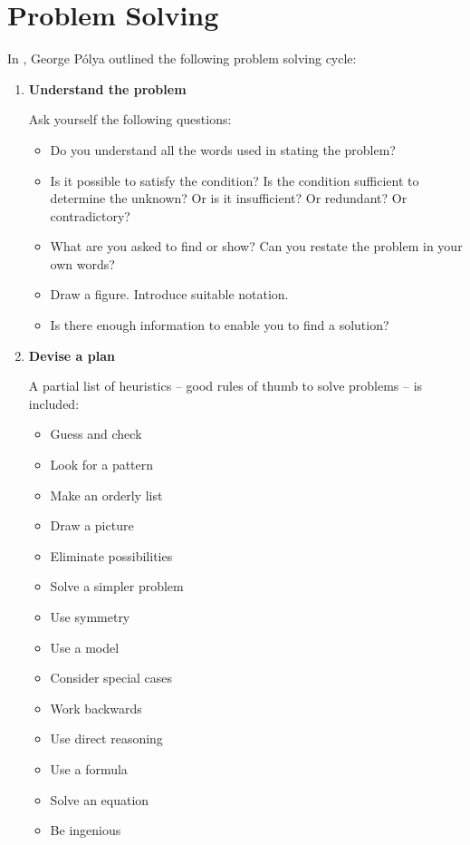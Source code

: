 \documentclass[12pt,a4 paper]{extreport}
\begin{document}
\section*{Problem Solving}
In \cite{polya}, George P\'{o}lya outlined the following problem solving cycle:
\begin{enumerate}
\item \textbf{Understand the problem}

Ask yourself the following questions:
\begin{itemize}
\item Do you understand all the words used in stating the problem?
\item Is it possible to satisfy the condition? Is the condition sufficient to determine the unknown? Or is it insufficient? Or redundant? Or contradictory?
\item What are you asked to find or show? Can you restate the problem in your own words?
\item Draw a figure. Introduce suitable notation.
\item Is there enough information to enable you to find a solution?
\end{itemize}

\item \textbf{Devise a plan}

A partial list of heuristics -- good rules of thumb to solve problems -- is included:
\begin{multicols}{2}
\begin{itemize}
\item Guess and check
\item Look for a pattern
\item Make an orderly list
\item Draw a picture
\item Eliminate possibilities
\item Solve a simpler problem
\item Use symmetry
\item Use a model
\item Consider special cases
\item Work backwards
\item Use direct reasoning
\item Use a formula
\item Solve an equation
\item Be ingenious
\end{itemize}
\end{multicols}


\end{enumerate}
\end{document}
